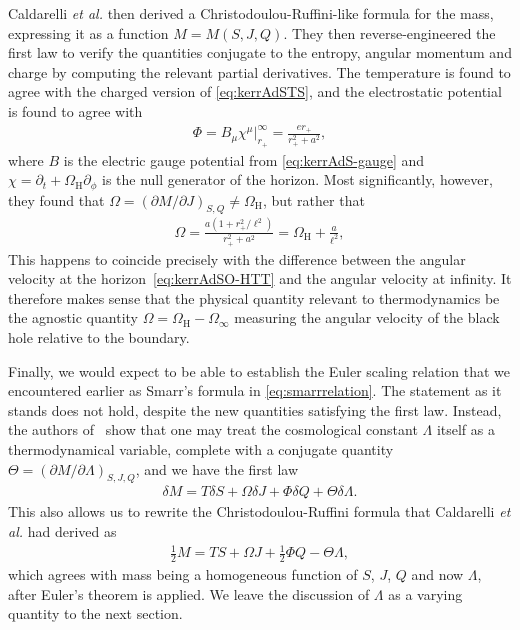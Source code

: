\documentclass[
twoside,
openright,
frontopenright,
]{dmathesis}
\begin{document}
Caldarelli \emph{et al.} then derived a Christodoulou-Ruffini-like formula for
the mass, expressing it as a function $M=M(S, J, Q)$. They then
reverse-engineered the first law to verify the quantities conjugate to the
entropy, angular momentum and charge by computing the relevant partial
derivatives. The temperature is found to agree with the charged version of
\cref{eq:kerrAdSTS}, and the electrostatic potential is found to agree with
\begin{align}
  \label{eq:kerrAdSP-CCK}
  \Phi = B_\mu\chi^\mu\Big|^\infty_{r_+}=\frac{er_+}{r_+^2+a^2},
\end{align}
where $B$ is the electric gauge potential from \cref{eq:kerrAdS-gauge} and
$\chi=\partial_t+\Omega_\mathrm{H}\partial_\phi$ is the null generator of the
horizon. Most significantly, however, they found that $\Omega = (\partial
M/\partial J)_{S,Q}\neq \Omega_\mathrm{H}$, but rather that
\begin{align}
  \label{eq:kerrAdSO-CCK}
  \Omega = \frac{a(1+r_+^2/\ell^2)}{r_+^2+a^2}=\Omega_\mathrm{H}+\frac{a}{\ell^2},
\end{align}
This happens to coincide precisely with the difference between the angular
velocity at the horizon~\eqref{eq:kerrAdSO-HTT} and the angular velocity at
infinity. It therefore makes sense that the physical quantity relevant to
thermodynamics be the agnostic quantity $\Omega =
\Omega_\mathrm{H}-\Omega_\infty$ measuring the angular velocity of the black
hole relative to the boundary.

Finally, we would expect to be able to establish the Euler scaling relation that
we encountered earlier as Smarr's formula in \cref{eq:smarrrelation}. The
statement as it stands does not hold, despite the new quantities satisfying the
first law. Instead, the authors of~\cite{Caldarelli:1999xj} show that one may
treat the cosmological constant $\Lambda$ itself as a thermodynamical variable,
complete with a conjugate quantity
$\Theta = (\partial M/ \partial \Lambda)_{S,J,Q}$, and we have the first law
\begin{align}
  \delta M = T\delta S + \Omega \delta J + \Phi \delta Q + \Theta \delta \Lambda.
\end{align}
This also allows us to rewrite the Christodoulou-Ruffini formula that Caldarelli
\emph{et al.} had derived as
\begin{align}
  \label{eq:smarrAdS1}
  \frac12 M= TS + \Omega J + \frac12 \Phi Q - \Theta \Lambda,
\end{align}
which agrees with mass being a homogeneous function of $S$, $J$, $Q$ and now
$\Lambda$, after Euler's theorem is applied. We leave the discussion of
$\Lambda$ as a varying quantity to the next section.
\end{document}
